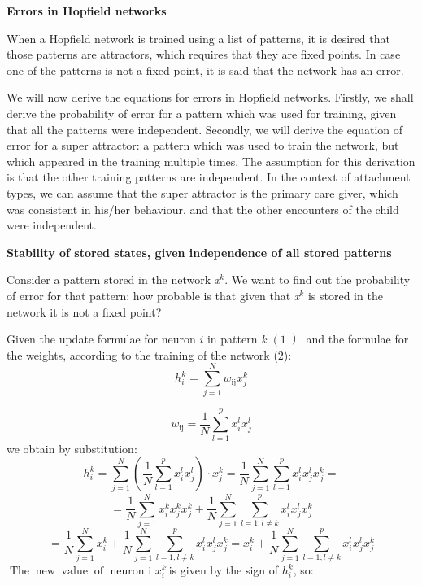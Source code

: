 \documentclass{letter}
\newcommand{\nocomma}{}
\newcommand{\noplus}{}
\newcommand{\tmem}[1]{{\em #1\/}}
\newcommand{\tmop}[1]{\ensuremath{\operatorname{#1}}}
\newcommand{\tmtextbf}[1]{{\bfseries{#1}}}
\newcommand{\tmtextit}[1]{{\itshape{#1}}}
\begin{document}
\tmtextbf{Errors in Hopfield networks}

When a Hopfield network is trained using a list of patterns, it is desired
that those patterns are attractors, which requires that they are fixed points.
In case one of the patterns is not a fixed point, it is said that the network
has an error.

{\tmem{}}We will now derive the equations for errors in Hopfield networks.
Firstly, we shall derive the probability of error for a pattern which was used
for training, given that all the patterns were independent. Secondly, we will
derive the equation of error for a super attractor: a pattern which was used
to train the network, but which appeared in the training multiple times. The
assumption for this derivation is that the other training patterns are
independent. In the context of attachment types, we can assume that the super
attractor is the primary care giver, which was consistent in his/her
behaviour, and that the other encounters of the child were independent.

\tmtextbf{Stability of stored states, given independence of all stored
patterns}

Consider a pattern stored in the network \tmtextit{x$^k$}. We want to find out
the probability of error for that pattern: how probable is that given that
\tmtextit{x$^k$} is stored in the network it is not a fixed point?

Given the update formulae for neuron $i$ in pattern \tmtextit{k } $\left( 1
\left) \right. \right.$ and the formulae for the weights, according to the
training of the network ($2$):
\[ h_i^k = \sum^N_{j = 1} w_{\tmop{ij}} x_j^k  \]

\begin{equation}
  w_{\tmop{ij}} = \frac{1}{N} \sum^p_{l = 1} x^l_{i^{}} x_j^l
\end{equation}
we obtain by substitution:
\[ h_i^k = \sum^N_{j = 1} \left(^{} \frac{1}{N} \sum^p_{l = 1} x^l_{i^{}}
   x^l_j \right)_{} \cdot x_j^k = \frac{1}{N}  \sum^N_{j = 1} \sum^p_{l = 1}
   x^l_{i^{}} x^l_j x^k_{^{} j} = \]
\[ = \frac{1}{N}  \sum^N_{j = 1}^{} x^k_{i^{}} x^k_j x^k_{^{} j} \noplus
   \noplus + \frac{1}{N}  \sum^N_{j = 1} \sum^p_{l = 1 \nocomma, l \neq k}
   x^l_{i^{}} x^l_j x^k_{^{} j} \]
\[ = \frac{1}{N}  \sum^N_{j = 1}^{} x^k_{i^{}} + \frac{1}{N}  \sum^N_{j = 1}
   \sum^p_{l = 1 \nocomma, l \neq k} x^l_{i^{}} x^l_j x^k_{^{} j} = x^k_{i^{}}
   + \frac{1}{N}  \sum^N_{j = 1} \sum^p_{l = 1 \nocomma, l \neq k} x^l_{i^{}}
   x^l_j x^k_{^{} j} \]
\[  \]
$\tmop{The} \tmop{new} \tmop{value} \tmop{of}$ neuron i $x^{k'}_i $is given by
the sign of $h_i^k $, so:
\end{document}
